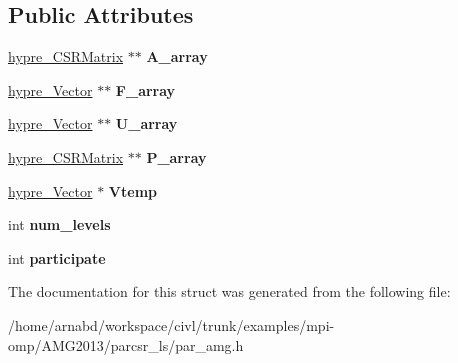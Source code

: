 \subsection*{Public Attributes}
\begin{DoxyCompactItemize}
\item 
\hypertarget{structhypre__SeqAMGData_ad3fae35efcd95d9636c6688d46636a6b}{}\hyperlink{structhypre__CSRMatrix}{hypre\+\_\+\+C\+S\+R\+Matrix} $\ast$$\ast$ {\bfseries A\+\_\+array}\label{structhypre__SeqAMGData_ad3fae35efcd95d9636c6688d46636a6b}

\item 
\hypertarget{structhypre__SeqAMGData_a0147100d4ebd925b979f0d36b5b32cd7}{}\hyperlink{structhypre__Vector}{hypre\+\_\+\+Vector} $\ast$$\ast$ {\bfseries F\+\_\+array}\label{structhypre__SeqAMGData_a0147100d4ebd925b979f0d36b5b32cd7}

\item 
\hypertarget{structhypre__SeqAMGData_a516e4fd21d9a77eda5caa435e23a0373}{}\hyperlink{structhypre__Vector}{hypre\+\_\+\+Vector} $\ast$$\ast$ {\bfseries U\+\_\+array}\label{structhypre__SeqAMGData_a516e4fd21d9a77eda5caa435e23a0373}

\item 
\hypertarget{structhypre__SeqAMGData_acb4de0d2570bacccfbd87596d8524398}{}\hyperlink{structhypre__CSRMatrix}{hypre\+\_\+\+C\+S\+R\+Matrix} $\ast$$\ast$ {\bfseries P\+\_\+array}\label{structhypre__SeqAMGData_acb4de0d2570bacccfbd87596d8524398}

\item 
\hypertarget{structhypre__SeqAMGData_a58b6f3bbb79da3838ad9537a1b623380}{}\hyperlink{structhypre__Vector}{hypre\+\_\+\+Vector} $\ast$ {\bfseries Vtemp}\label{structhypre__SeqAMGData_a58b6f3bbb79da3838ad9537a1b623380}

\item 
\hypertarget{structhypre__SeqAMGData_ab2f291853877b5e81fb6f987f4c9014f}{}int {\bfseries num\+\_\+levels}\label{structhypre__SeqAMGData_ab2f291853877b5e81fb6f987f4c9014f}

\item 
\hypertarget{structhypre__SeqAMGData_a9cf172c1d5451dad6da8cd398ed49b98}{}int {\bfseries participate}\label{structhypre__SeqAMGData_a9cf172c1d5451dad6da8cd398ed49b98}

\end{DoxyCompactItemize}


The documentation for this struct was generated from the following file\+:\begin{DoxyCompactItemize}
\item 
/home/arnabd/workspace/civl/trunk/examples/mpi-\/omp/\+A\+M\+G2013/parcsr\+\_\+ls/par\+\_\+amg.\+h\end{DoxyCompactItemize}
